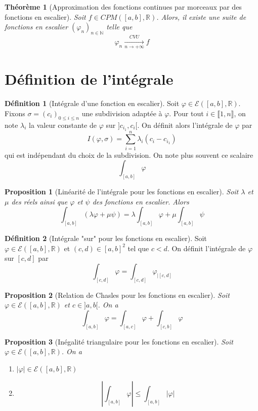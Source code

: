 \documentclass[french]{book}
\newcommand{\N}{\mathbb{N}}
\newcommand{\R}{\mathbb{R}}
\theoremstyle{plain}
\newtheorem{thm}{Théorème}[chapter]
\newtheorem{prop}{Proposition}[chapter]
\theoremstyle{definition}
\newtheorem{dfn}{Définition}[chapter]
\theoremstyle{remark}
\begin{document}
\begin{thm}[Approximation des fonctions continues par morceaux par des fonctions en escalier]
	Soit $f\in CPM([a,b],\R)$. Alors, il existe une suite de fonctions en escalier $(\varphi_n)_{n\in\N}$ telle que $$\varphi_n \xrightarrow[n\to+\infty]{CVU} f$$
\end{thm}

\section{Définition de l'intégrale}
\begin{dfn}[Intégrale d'une fonction en escalier]
	Soit $\varphi\in\mathcal{E}([a,b],\R)$. Fixons $\sigma=(c_i)_{0\leqslant i\leqslant n}$ une subdivision adaptée à $\varphi$. Pour tout $i\in\llbracket1,n\rrbracket$, on note $\lambda_i$ la valeur constante de $\varphi$ sur $]c_{i_1},c_i[$. On définit alors l'intégrale de $\varphi$ par $$I(\varphi,\sigma)=\sum_{i=1}^{n}\lambda_i(c_i-c_{i_1})$$ qui est indépendant du choix de la subdivision. On note plus souvent ce  scalaire $$\int_{[a,b]}\varphi$$
\end{dfn}
\begin{prop}[Linéarité de l'intégrale pour les fonctions en escalier]
	Soit $\lambda$ et $\mu$ des réels ainsi que $\varphi$ et $\psi$ des fonctions en escalier. Alors $$\int_{[a,b]}(\lambda\varphi+\mu\psi)=\lambda\int_{[a,b]}\varphi + \mu\int_{[a,b]}\psi$$
\end{prop}
\begin{dfn}[Intégrale "sur" pour les fonctions en escalier]
	Soit $\varphi\in\mathcal{E}([a,b],\R)$ et $(c,d)\in[a,b]^2$ tel que $c<d$. On définit l'intégrale de $\varphi$ sur $[c,d]$ par $$\int_{[c,d]}\varphi=\int_{[c,d]}\varphi_{|[c,d]}$$
\end{dfn}
\begin{prop}[Relation de Chasles pour les fonctions en escalier]
	Soit $\varphi\in\mathcal{E}([a,b],\R)$ et $c\in]a,b[$. On a $$\int_{[a,b]}\varphi=\int_{[a,c]}\varphi+\int_{[c,b]}\varphi$$
\end{prop}
\begin{prop}[Inégalité triangulaire pour les fonctions en escalier]
	Soit $\varphi\in\mathcal{E}([a,b],\R)$. On a
	\begin{enumerate}
		\item $|\varphi|\in\mathcal{E}([a,b],\R)$
		\item $$\left\lvert\int_{[a,b]}\varphi\right\rvert \leqslant \int_{[a,b]}\lvert\varphi\rvert$$
	\end{enumerate}
\end{prop}
\end{document}

